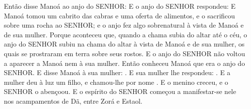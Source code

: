 {  Então disse Manoá ao anjo do SENHOR: 
  E o anjo do SENHOR respondeu: 
  E Manoá tomou um cabrito das cabras e uma oferta de alimentos, e o sacrificou sobre uma rocha ao SENHOR; e o anjo fez algo sobrenatural à vista de Manoá e de sua mulher.
  Porque aconteceu que, quando a chama subia do altar até o céu, o anjo do SENHOR subiu na chama do altar à vista de Manoá e de sua mulher, os quais se prostraram em terra sobre seus rostos.
  E o anjo do SENHOR não voltou a aparecer a Manoá nem à sua mulher. Então conheceu Manoá que era o anjo do SENHOR.
  E disse Manoá à sua mulher: .
  E sua mulher lhe respondeu: .
  E a mulher deu à luz um filho, e chamou-lhe por nome . E o menino creceu, e o SENHOR o abençoou.
  E o espírito do SENHOR começou a manifestar-se nele nos acampamentos de Dã, entre Zorá e Estaol.
\par }

